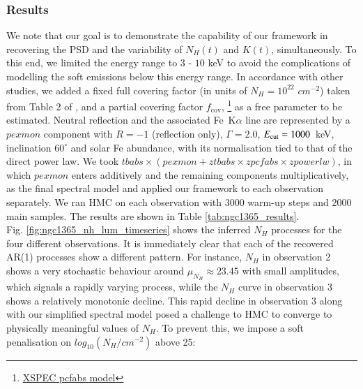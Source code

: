\documentclass{aa}
\begin{document}
\subsubsection{Results}
\label{sec:ngc1365_results}
We note that our goal is to demonstrate the capability of our framework in recovering the PSD and the variability of $N_H(t)$ and $K(t)$, simultaneously. To this end, we limited the energy range to $3$ - $10$ keV to avoid the complications of modelling the soft emissions below this energy range. In accordance with other studies, we added a fixed full covering factor (in units of $N_H = 10^{22}$ $cm^{-2}$) taken from Table 2 of \citet{Rivers2015}, and a partial covering factor $f_{\mathrm{cov}}$, \footnote{\href{https://heasarc.gsfc.nasa.gov/docs/software/xspec/manual/XSmodelPcfabs.html}{XSPEC pcfabs model}} as a free parameter to be estimated. Neutral reflection and the associated Fe~K$\alpha$ line are represented by a $pexmon$ component with $R = -1$ (reflection only), $\Gamma = 2.0$, $E_{\rm cut} = 1000$~keV, inclination $60^{\circ}$ and solar Fe abundance, with its normalisation tied to that of the direct power law. We took $tbabs \times (pexmon + ztbabs \times zpcfabs \times zpowerlw)$, in which $pexmon$ enters additively and the remaining components multiplicatively, as the final spectral model and applied our framework to each observation separately. We ran HMC on each observation with 3000 warm-up steps and 2000 main samples. The results are shown in Table \ref{tab:ngc1365_results}. \\
Fig. \ref{fig:ngc1365_nh_lum_timeseries} shows the inferred $N_H$ processes for the four different observations. It is immediately clear that each of the recovered AR(1) processes show a different pattern. For instance, $N_H$ in observation 2 shows a very stochastic behaviour around
$\mu_{N_H} \approx 23.45$ with small amplitudes, which signals a rapidly varying
process, while the $N_H$ curve in observation 3 shows a relatively monotonic decline. This rapid decline in observation 3 along with our simplified spectral model posed a challenge to HMC to converge to physically meaningful values of $N_H$. To prevent this, we impose a soft penalisation on $log_{10}(N_H/cm^{-2})$ above 25: 
\end{document}
